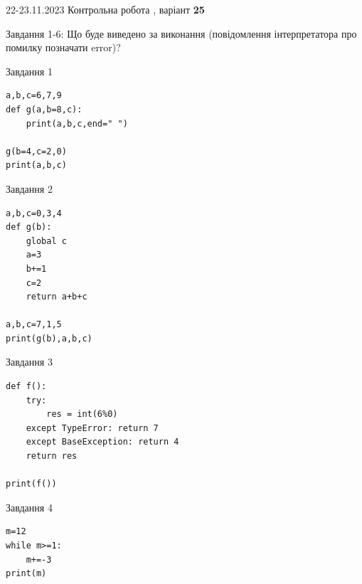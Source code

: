 \documentclass[12pt, ukrainian]{article}
\begin{document}
{{22-23.11.2023 Контрольна робота , варіант  \No \textbf { 25 }\par}}
{

Завдання 1-6: Що буде виведено за виконання (повідомлення інтерпретатора про помилку позначати error)?


\begin{minipage}[t]{9.7cm}                
{\begin{center}Завдання {1}\end{center}}
\begin{verbatim}
a,b,c=6,7,9
def g(a,b=8,c):
    print(a,b,c,end=" ")

g(b=4,c=2,0)
print(a,b,c)
\end{verbatim}     
\end{minipage}
\vline \hspace{8mm}
\begin{minipage}[t]{8.0cm}                
{\begin{center}Завдання {2}\end{center}}
\begin{verbatim}
a,b,c=0,3,4
def g(b):
    global c
    a=3
    b+=1
    c=2
    return a+b+c

a,b,c=7,1,5
print(g(b),a,b,c)
\end{verbatim}     
\end{minipage}

\vspace{15mm}
\begin{minipage}[t]{9.7cm}                
{\begin{center}Завдання {3}\end{center}}
\begin{verbatim}
def f():
    try:
        res = int(6%0)
    except TypeError: return 7
    except BaseException: return 4
    return res

print(f())
\end{verbatim}     
\end{minipage}
\vline \hspace{8mm}
\begin{minipage}[t]{8.0cm}                
{\begin{center}Завдання {4}\end{center}}
\begin{verbatim}
m=12
while m>=1:
    m+=-3
print(m)
\end{verbatim}     
\end{minipage}

}
\end{document}
